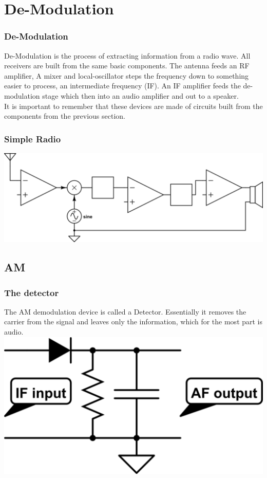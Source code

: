 \documentclass[10pt]{beamer}
\begin{document}
\section{De-Modulation}

\begin{frame}
\frametitle{De-Modulation}
De-Modulation is the process of extracting information from a radio wave. All receivers are built from the same basic components. The antenna feeds an RF amplifier, A mixer and local-oscillator steps the frequency down to something easier to process, an intermediate frequency (IF). An IF amplifier feeds the de-modulation stage which then into an audio amplifier and out to a speaker. 
\\
It is important to remember that these devices are made of circuits built from the components from the previous section.
\end{frame}

\begin{frame}
\frametitle{Simple Radio}
\includegraphics[width=.9\textwidth]{simplereciever.png}
\end{frame}

\subsection{AM}
\begin{frame}
\frametitle{The detector}
The AM demodulation device is called a Detector. Essentially it removes the carrier from the signal and leaves only the information, which for the most part is audio.
\includegraphics[width=.9\textwidth]{simpledetector.png}
\end{frame}
\end{document}
